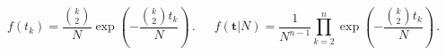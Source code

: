 \begin{frame}
\bigskip

\begin{columns}


\begin{equation*}
f(t_k)=\frac{{k \choose 2}}{N}\exp\left(-\frac{{k \choose 2}t_k}{N}\right)\,.
\end{equation*}


\begin{equation*}
f(\mathbf{t}|N)=\frac{1}{N^{n-1}}\prod_{k=2}^n\exp\left(-\frac{{k \choose 2}t_k}{N}\right)\,.
\end{equation*}

\end{columns}

\end{frame}

